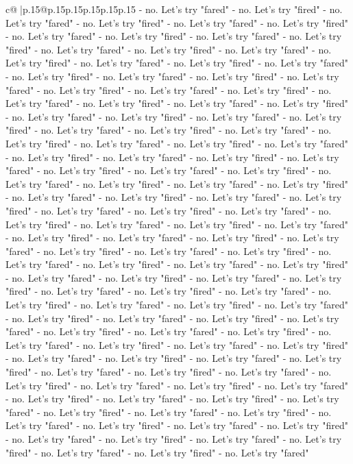 \documentclass{article}
\begin{document}
{\begin{supertabular}{c@{$\;$}|p{.15\linewidth}@{}p{.15\linewidth}p{.15\linewidth}p{.15\linewidth}p{.15\linewidth}p{.15\linewidth}}
{{{{-} no. Let's try "fared" {-} no. Let's try "fired" {-} no. Let's try "fared" {-} no. Let's try "fired" {-} no. Let's try "fared" {-} no. Let's try "fired" {-} no. Let's try "fared" {-} no. Let's try "fired" {-} no. Let's try "fared" {-} no. Let's try "fired" {-} no. Let's try "fared" {-} no. Let's try "fired" {-} no. Let's try "fared" {-} no. Let's try "fired" {-} no. Let's try "fared" {-} no. Let's try "fired" {-} no. Let's try "fared" {-} no. Let's try "fired" {-} no. Let's try "fared" {-} no. Let's try "fired" {-} no. Let's try "fared" {-} no. Let's try "fired" {-} no. Let's try "fared" {-} no. Let's try "fired" {-} no. Let's try "fared" {-} no. Let's try "fired" {-} no. Let's try "fared" {-} no. Let's try "fired" {-} no. Let's try "fared" {-} no. Let's try "fired" {-} no. Let's try "fared" {-} no. Let's try "fired" {-} no. Let's try "fared" {-} no. Let's try "fired" {-} no. Let's try "fared" {-} no. Let's try "fired" {-} no. Let's try "fared" {-} no. Let's try "fired" {-} no. Let's try "fared" {-} no. Let's try "fired" {-} no. Let's try "fared" {-} no. Let's try "fired" {-} no. Let's try "fared" {-} no. Let's try "fired" {-} no. Let's try "fared" {-} no. Let's try "fired" {-} no. Let's try "fared" {-} no. Let's try "fired" {-} no. Let's try "fared" {-} no. Let's try "fired" {-} no. Let's try "fared" {-} no. Let's try "fired" {-} no. Let's try "fared" {-} no. Let's try "fired" {-} no. Let's try "fared" {-} no. Let's try "fired" {-} no. Let's try "fared" {-} no. Let's try "fired" {-} no. Let's try "fared" {-} no. Let's try "fired" {-} no. Let's try "fared" {-} no. Let's try "fired" {-} no. Let's try "fared" {-} no. Let's try "fired" {-} no. Let's try "fared" {-} no. Let's try "fired" {-} no. Let's try "fared" {-} no. Let's try "fired" {-} no. Let's try "fared" {-} no. Let's try "fired" {-} no. Let's try "fared" {-} no. Let's try "fired" {-} no. Let's try "fared" {-} no. Let's try "fired" {-} no. Let's try "fared" {-} no. Let's try "fired" {-} no. Let's try "fared" {-} no. Let's try "fired" {-} no. Let's try "fared" {-} no. Let's try "fired" {-} no. Let's try "fared" {-} no. Let's try "fired" {-} no. Let's try "fared" {-} no. Let's try "fired" {-} no. Let's try "fared" {-} no. Let's try "fired" {-} no. Let's try "fared" {-} no. Let's try "fired" {-} no. Let's try "fared" {-} no. Let's try "fired" {-} no. Let's try "fared" {-} no. Let's try "fired" {-} no. Let's try "fared" {-} no. Let's try "fired" {-} no. Let's try "fared" {-} no. Let's try "fired" {-} no. Let's try "fared" {-} no. Let's try "fired" {-} no. Let's try "fared" {-} no. Let's try "fired" {-} no. Let's try "fared" {-} no. Let's try "fired" {-} no. Let's try "fared" {-} no. Let's try "fired" {-} no. Let's try "fared" {-} no. Let's try "fired" {-} no. Let's try "fared" {-} no. Let's try "fired" {-} no. Let's try "fared" {-} no. Let's try "fired" {-} no. Let's try "fared" {-} no. Let's try "fired" {-} no. Let's try "fared" {-} no. Let's try "fired" {-} no. Let's try "fared" {-} no. Let's try "fired" {-} no. Let's try "fared" {-} no. Let's try "fired" {-} no. Let's try "fared" {-} no. Let's try "fired" {-} no. Let's try "fared" {-} no. Let's try "fired" {-} no. Let's try "fared" }}}
\end{supertabular}}
\end{document}
